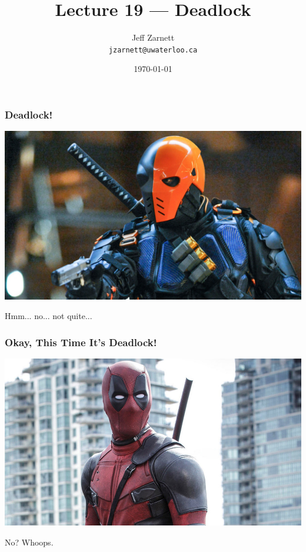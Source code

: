 

\title{Lecture 19 --- Deadlock }

\author{Jeff Zarnett \\ \small \texttt{jzarnett@uwaterloo.ca}}
\date{\today}




\begin{frame}
	\titlepage

\end{frame}


\begin{frame}
	\frametitle{Deadlock!}

	\begin{center}
		\includegraphics[width=\textwidth]{images/deathstroke.jpg}
	\end{center}

	Hmm... no... not quite...

\end{frame}


\begin{frame}
	\frametitle{Okay, This Time It's Deadlock!}

	\begin{center}
		\includegraphics[width=\textwidth]{images/deadpool.jpg}
	\end{center}

	No? Whoops.

\end{frame}


